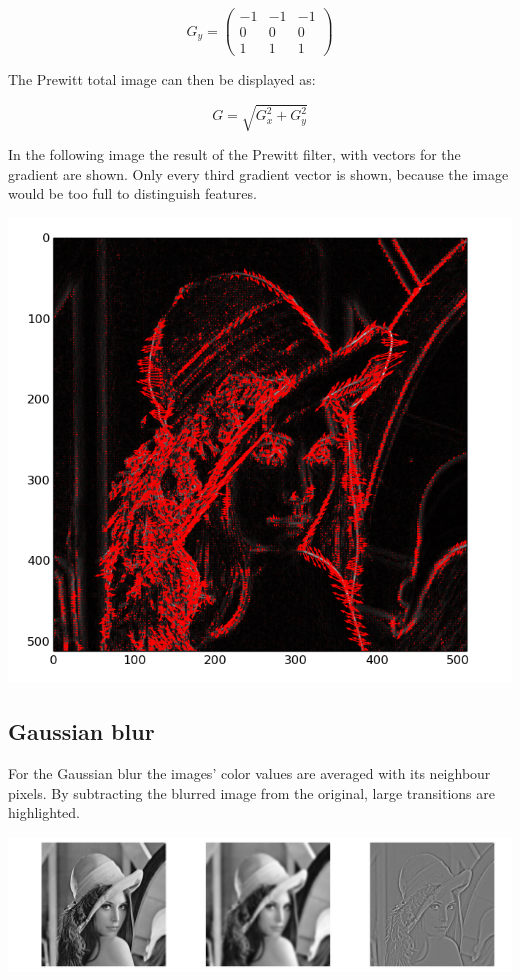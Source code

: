 \documentclass[a4paper,12px]{article}
\begin{document}
$$ G_y = \left(\begin{array}{ccc} -1 & -1 & -1 \\ 0 & 0 & 0 \\ 1 & 1 & 1
\end{array}\right)$$

The Prewitt total image can then be displayed as:

$$ G = \sqrt{G_x^2 + G_y^2} $$

In the following image the result of the Prewitt filter, with vectors for the
gradient are shown.  Only every third gradient vector is shown, because the
image would be too full to distinguish features.

\begin{center}
    \includegraphics[width=\textwidth]{gradient}
\end{center}

\subsection{Gaussian blur}

For the Gaussian blur the images' color values are averaged with its neighbour
pixels. By subtracting the blurred image from the original, large transitions
are highlighted.

\begin{center}
    \includegraphics[width=\textwidth]{gauss}
\end{center}
\end{document}
